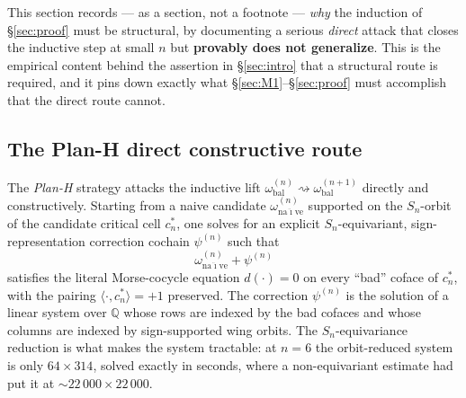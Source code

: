 \documentclass[11pt,reqno]{amsart}
\theoremstyle{plain}
\theoremstyle{definition}
\newcommand{\Q}{\mathbb{Q}}
\newcommand{\omegabal}[1]{\omega_{\mathrm{bal}}^{(#1)}}
\newcommand{\cstar}[1]{c^{*}_{#1}}
\begin{document}
This section records --- as a section, not a footnote --- \emph{why}
the induction of \S\ref{sec:proof} must be structural, by documenting a
serious \emph{direct} attack that closes the inductive step at small $n$
but \textbf{provably does not generalize}. This is the empirical
content behind the assertion in \S\ref{sec:intro} that a structural
route is required, and it pins down exactly what \S\ref{sec:M1}--\S\ref{sec:proof}
must accomplish that the direct route cannot.

\subsection{The Plan-H direct constructive route}\label{ssec:8.1}
The \emph{Plan-H} strategy attacks the inductive lift
$\omegabal n\rightsquigarrow\omegabal{n+1}$ directly and constructively.
Starting from a naive candidate $\omega^{(n)}_{\mathrm{na\ddot\imath ve}}$
supported on the $S_n$-orbit of the candidate critical cell $\cstar n$,
one solves for an explicit $S_n$-equivariant, sign-representation
correction cochain $\psi^{(n)}$ such that
\[
  \omega^{(n)}_{\mathrm{na\ddot\imath ve}}+\psi^{(n)}
\]
satisfies the literal Morse-cocycle equation $d(\cdot)=0$ on every
``bad'' coface of $\cstar n$, with the pairing
$\langle\cdot,\cstar n\rangle=+1$ preserved. The correction $\psi^{(n)}$
is the solution of a linear system over $\Q$ whose rows are indexed by
the bad cofaces and whose columns are indexed by sign-supported wing
orbits. The $S_n$-equivariance reduction is what makes the system
tractable: at $n=6$ the orbit-reduced system is only $64\times314$,
solved exactly in seconds, where a non-equivariant estimate had put it
at ${\sim}22\,000\times22\,000$.
\end{document}
